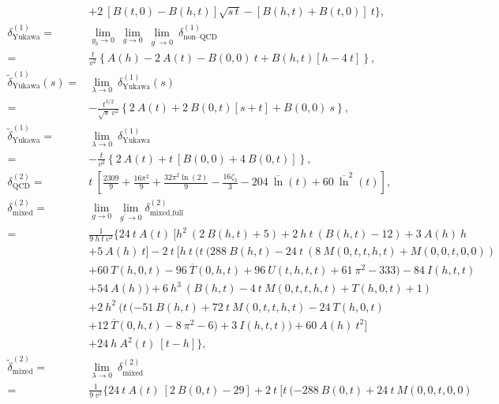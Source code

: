 \documentclass[a4paper,12pt]{book}
\begin{document}
\begin{appendices}
\begin{align}
&+2\> [B(t,0)-B(h,t)]\sqrt{s\,t}-[B(h,t)+B(t,0)]\>t\},\\ 
\nonumber
\delta^{(1)}_\text{Yukawa} ={}& \lim_{y_b\rightarrow 0}\> \lim_{g\rightarrow 0}\>\lim_{g^\prime\rightarrow 0}\> \delta^{(1)}_\text{non--QCD}\\
={}& \frac{t}{v^2}\left\lbrace A(h)-2\> A(t)- B(0,0)\>t+B(h,t)\left[h-4\>t\right]\right\rbrace,\\ 
\nonumber
\tilde{\delta}^{(1)}_\text{Yukawa}(s) ={}& \lim_{\lambda\rightarrow 0}\> \delta^{(1)}_\text{Yukawa}(s)\\
={}& -\frac{t^{3/2}}{\sqrt{s}\>v^2}\left\lbrace 2\> A(t)+ 2 \> B(0,t)[s+t]+B(0,0)\>s\right\rbrace,\\ 
\nonumber
\tilde{\delta}^{(1)}_\text{Yukawa} ={}& \lim_{\lambda\rightarrow 0}\> \delta^{(1)}_\text{Yukawa}\\
={}& -\frac{t}{v^2}\left\lbrace 2\> A(t)+ t\>[B(0,0)+4\>B(0,t)]\right\rbrace,\\ 
\delta^{(2)}_\text{QCD}={}& t\> \left[
\frac{2309}{9} + \frac{16 \pi^2}{9} + \frac{32 \pi^2 \ln(2)}{9} - \frac{16 \zeta_3}{3} - 204\>  \overline{\ln}(t) + 60 \>\overline{\ln}^2(t)\right],\\
   \nonumber
\delta^{(2)}_\text{mixed} ={}& \lim_{g \rightarrow 0}\> \lim_{g^\prime \rightarrow 0} \delta^{(2)}_\text{mixed,full}\\
   \nonumber
={}& \frac{1}{9\> h\> t\> v^2}\{24\> t \>A(t)\> [h^2\> (2 \>B(h,t)+5)+2\> h \>t \>(B(h,t)-12)+3 \>A(h)\> h\\
   \nonumber
&+5 \>A(h) \>t] -2\> t\> [h\> t
   \>(t\> (288\> B(h,t)-24\> t \>(8\> M(0,t,t,h,t)+M(0,0,t,0,0))\\
   \nonumber
&+60
\>T(h,0,t)-96\> \overline{T}(0,h,t)+96
   \>U(t,h,t,t)+61 \>\pi ^2-333)-84 \>I(h,t,t)\\
   \nonumber
&+54\>
A(h))+6\> h^3 \>(B(h,t)-4\> t
   \>M(0,t,t,h,t)+T(h,0,t)+1)\\
      \nonumber
   &+2 \>h^2\> (t\> (-51 \>B(h,t)+72\> t
\>M(0,t,t,h,t)-24\> T(h,0,t)\\
\nonumber
& +12\>\overline{T}(0,h,t)-8\> \pi ^2-6) +3\> I(h,t,t))+60\> A(h) \>t^2]\\
& +24\> h\> A^2(t)\>[t-h]\},\\
\nonumber
\tilde{\delta}^{(2)}_\text{mixed} ={}&\lim_{\lambda \rightarrow 0} \>\delta^{(2)}_\text{mixed}\\
   \nonumber
={}& \frac{1}{9\> v^2} \{24\> t\> A(t)\> [2\> B(0,t)-29]+2\> t \>[t\> (-288\> B(0,t)+24\> t
\>M(0,0,t,0,0)\\

\end{align}
\end{appendices}
\end{document}
